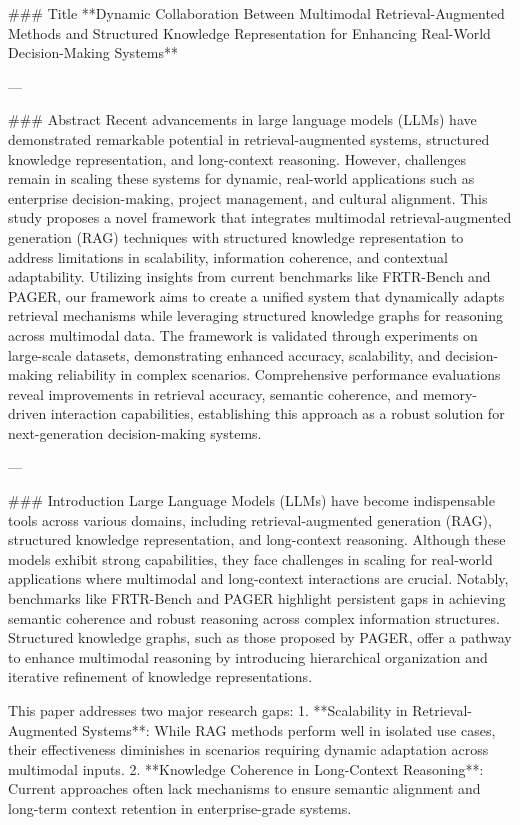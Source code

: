 ### Title  
**Dynamic Collaboration Between Multimodal Retrieval-Augmented Methods and Structured Knowledge Representation for Enhancing Real-World Decision-Making Systems**

---

### Abstract  
Recent advancements in large language models (LLMs) have demonstrated remarkable potential in retrieval-augmented systems, structured knowledge representation, and long-context reasoning. However, challenges remain in scaling these systems for dynamic, real-world applications such as enterprise decision-making, project management, and cultural alignment. This study proposes a novel framework that integrates multimodal retrieval-augmented generation (RAG) techniques with structured knowledge representation to address limitations in scalability, information coherence, and contextual adaptability. Utilizing insights from current benchmarks like FRTR-Bench and PAGER, our framework aims to create a unified system that dynamically adapts retrieval mechanisms while leveraging structured knowledge graphs for reasoning across multimodal data. The framework is validated through experiments on large-scale datasets, demonstrating enhanced accuracy, scalability, and decision-making reliability in complex scenarios. Comprehensive performance evaluations reveal improvements in retrieval accuracy, semantic coherence, and memory-driven interaction capabilities, establishing this approach as a robust solution for next-generation decision-making systems.

---

### Introduction  
Large Language Models (LLMs) have become indispensable tools across various domains, including retrieval-augmented generation (RAG), structured knowledge representation, and long-context reasoning. Although these models exhibit strong capabilities, they face challenges in scaling for real-world applications where multimodal and long-context interactions are crucial. Notably, benchmarks like FRTR-Bench and PAGER highlight persistent gaps in achieving semantic coherence and robust reasoning across complex information structures. Structured knowledge graphs, such as those proposed by PAGER, offer a pathway to enhance multimodal reasoning by introducing hierarchical organization and iterative refinement of knowledge representations.

This paper addresses two major research gaps:  
1. **Scalability in Retrieval-Augmented Systems**: While RAG methods perform well in isolated use cases, their effectiveness diminishes in scenarios requiring dynamic adaptation across multimodal inputs.  
2. **Knowledge Coherence in Long-Context Reasoning**: Current approaches often lack mechanisms to ensure semantic alignment and long-term context retention in enterprise-grade systems.

